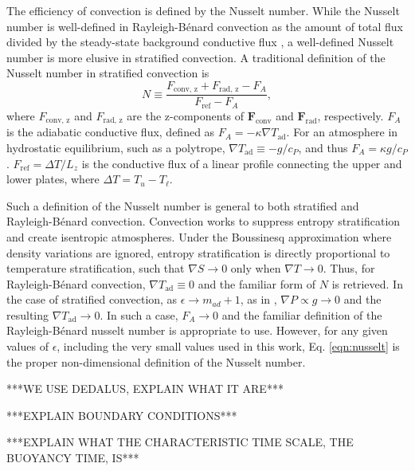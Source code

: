\documentclass[aps, prl, twocolumn, groupedaddress]{revtex4-1}
\newcommand{\grad}{\ensuremath{\nabla}}
\newcommand{\RB}{Rayleigh-B\'{e}nard }
\begin{document}
The efficiency of convection is defined by the Nusselt number.  While the Nusselt number is well-defined in \RB convection
as the amount of total flux divided by the steady-state background conductive flux 
\cite{johnston&doering2009, otero&all2002},
a well-defined Nusselt number is more elusive in stratified convection.  A traditional definition of the Nusselt
number in stratified convection is \cite{graham1975,hurlburt1984}
\begin{equation}
N \equiv \frac{F_{\text{conv, z}} + F_{\text{rad, z}} - F_A}{F_{\text{ref}} - F_A},
\label{eqn:nusselt}
\end{equation}
where $F_{\text{conv, z}}$ and $F_{\text{rad, z}}$ are the z-components of $\bm{F}_{\text{conv}}$ and $\bm{F}_{\text{rad}}$,
respectively.  $F_A$ is the adiabatic conductive flux, defined as $F_A = -\kappa \grad T_{\text{ad}}$.  For an
atmosphere in hydrostatic equilibrium, such as a polytrope, $\grad T_{\text{ad}} \equiv - g / c_{P}$, and thus
$F_A = \kappa g / c_{P}$.  $F_{\text{ref}} = \Delta T / L_z$ is the conductive flux of a linear profile connecting the upper
and lower plates, where $\Delta T = T_{u} - T_{\ell}$.

Such a definition of the Nusselt number is general to both stratified and \RB convection.  Convection works to
suppress entropy stratification and create isentropic atmospheres.  Under the Boussinesq approximation where
density variations are ignored, entropy stratification is directly proportional to temperature stratification,
such that $\grad S \rightarrow 0$ only when $\grad T \rightarrow 0$.  Thus, for \RB convection, 
$\grad T_{\text{ad}} \equiv 0$ and the familiar form of $N$ is retrieved.  In the case of stratified convection,
as $\epsilon \rightarrow m_{ad} + 1$, as in \cite{brandenburg2015}, $\grad P \propto g \rightarrow 0$ and
the resulting $\grad T_{\text{ad}} \rightarrow 0$.  In such a case, $F_A \rightarrow 0$ and the familiar
definition of the \RB nusselt number is appropriate to use. However, for any given values of $\epsilon$, including
the very small values used in this work, Eq. \ref{eqn:nusselt} is the proper non-dimensional definition
of the Nusselt number.

***WE USE DEDALUS, EXPLAIN WHAT IT ARE***

***EXPLAIN BOUNDARY CONDITIONS***

***EXPLAIN WHAT THE CHARACTERISTIC TIME SCALE, THE BUOYANCY TIME, IS***
\end{document}
